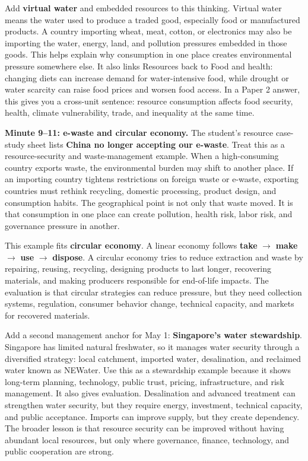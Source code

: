 \documentclass[11pt,a4paper]{article}
\newcommand{\term}[1]{\textcolor{HeadingBlue}{\textbf{#1}}}
\begin{document}
Add \term{virtual water} and embedded resources to this thinking. Virtual water
means the water used to produce a traded good, especially food or manufactured
products. A country importing wheat, meat, cotton, or electronics may also be
importing the water, energy, land, and pollution pressures embedded in those
goods. This helps explain why consumption in one place creates environmental
pressure somewhere else. It also links Resources back to Food and health:
changing diets can increase demand for water-intensive food, while drought or
water scarcity can raise food prices and worsen food access. In a Paper 2
answer, this gives you a cross-unit sentence: resource consumption affects food
security, health, climate vulnerability, trade, and inequality at the same time.

\textbf{Minute 9--11: e-waste and circular economy.}
The student's resource case-study sheet lists \term{China no longer accepting
our e-waste}. Treat this as a resource-security and waste-management example.
When a high-consuming country exports waste, the environmental burden may shift
to another place. If an importing country tightens restrictions on foreign waste
or e-waste, exporting countries must rethink recycling, domestic processing,
product design, and consumption habits. The geographical point is not only that
waste moved. It is that consumption in one place can create pollution, health
risk, labor risk, and governance pressure in another.

This example fits \term{circular economy}. A linear economy follows
\term{take} $\rightarrow$ \term{make} $\rightarrow$ \term{use} $\rightarrow$
\term{dispose}. A circular economy tries to reduce extraction and waste by
repairing, reusing, recycling, designing products to last longer, recovering
materials, and making producers responsible for end-of-life impacts. The
evaluation is that circular strategies can reduce pressure, but they need
collection systems, regulation, consumer behavior change, technical capacity,
and markets for recovered materials.

Add a second management anchor for May 1: \term{Singapore's water stewardship}.
Singapore has limited natural freshwater, so it manages water security through a
diversified strategy: local catchment, imported water, desalination, and
reclaimed water known as NEWater. Use this as a stewardship example because it
shows long-term planning, technology, public trust, pricing, infrastructure, and
risk management. It also gives evaluation. Desalination and advanced treatment
can strengthen water security, but they require energy, investment, technical
capacity, and public acceptance. Imports can improve supply, but they create
dependency. The broader lesson is that resource security can be improved without
having abundant local resources, but only where governance, finance, technology,
and public cooperation are strong.
\end{document}
